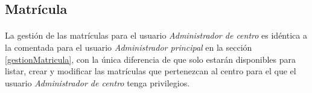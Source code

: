 \subsection{Matrícula}

  \paragraph{}La gestión de las matrículas para el usuario
  \textit{Administrador de centro} es idéntica a la comentada para el usuario
  \textit{Administrador principal} en la sección \ref{gestionMatricula}, con la
  única diferencia de que solo estarán disponibles para listar, crear y
  modificar las matrículas que pertenezcan al centro para el que el usuario
  \textit{Administrador de centro} tenga privilegios.